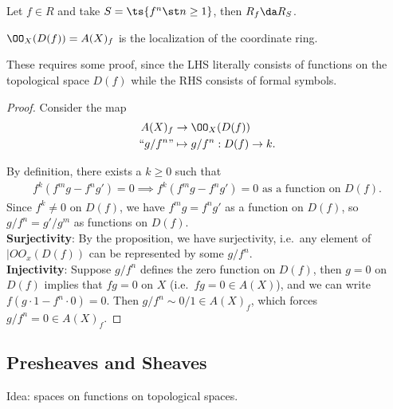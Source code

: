 \begin{example}

Let \(f\in R\) and take \(S = \ts{f^n \st n\geq 1}\), then
\(R_f \da R_S\).

\end{example}

\begin{corollary}[?]

\(\OO_X(D(f)) = A(X)_f\) is the localization of the coordinate ring.

\end{corollary}

These requires some proof, since the LHS literally consists of functions
on the topological space \(D(f)\) while the RHS consists of formal
symbols.

\begin{proof}

Consider the map
\begin{align*}  
A(X)_f &\to \OO_X(D(f)) \\
``g/f^n" &\mapsto g/f^n: D(f) \to k
.\end{align*}

By definition, there exists a \(k\geq 0\) such that
\begin{align*}  
f^k(f^m g - f^n g') = 0 
\implies
f^k(f^m g - f^n g') = 0 \text{ as a function on } D(f)
.\end{align*} Since \(f^k \neq 0\) on \(D(f)\), we have
\(f^m g = f^n g'\) as a function on \(D(f)\), so \(g/f^n = g'/g^m\) as
functions on \(D(f)\).\\

\textbf{Surjectivity}: By the proposition, we have surjectivity,
i.e.~any element of \(|OO_x(D(f))\) can be represented by some
\(g/f^n\).\\

\textbf{Injectivity}: Suppose \(g/f^n\) defines the zero function on
\(D(f)\), then \(g = 0\) on \(D(f)\) implies that \(fg=0\) on \(X\)
(i.e.~\(fg= 0 \in A(X)\)), and we can write
\(f(g\cdot 1 - f^n\cdot 0) = 0\). Then \(g/f^n\sim 0/1 \in A(X)_f\),
which forces \(g/f^n = 0\in A(X)_f\).

\end{proof}

\hypertarget{presheaves-and-sheaves}{%
\subsection{Presheaves and Sheaves}\label{presheaves-and-sheaves}}

Idea: spaces on functions on topological spaces.

